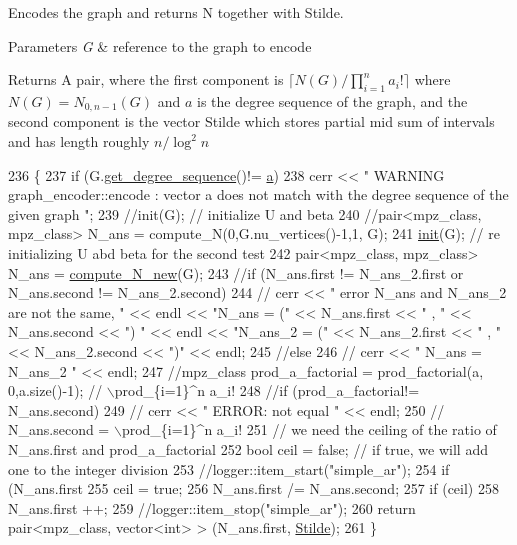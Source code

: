 Encodes the graph and returns N together with Stilde. 


\begin{DoxyParams}{Parameters}
{\em G} & reference to the graph to encode \\
\hline
\end{DoxyParams}
\begin{DoxyReturn}{Returns}
A pair, where the first component is $\lceil N(G) / \prod_{i=1}^n a_i! \rceil$ where $N(G) = N_{0,n-1}(G)$ and $a$ is the degree sequence of the graph, and the second component is the vector Stilde which stores partial mid sum of intervals and has length roughly $n / \log^2 n$ 
\end{DoxyReturn}

\begin{DoxyCode}
236                                                                  \{
237   \textcolor{keywordflow}{if} (G.\hyperlink{classgraph_afdca627df7fb93a7d1d8a547f616e948}{get\_degree\_sequence}()!= \hyperlink{classgraph__encoder_a56eb5cf480ae5c2fca9f3a45f2ffd4f1}{a})
238     cerr << \textcolor{stringliteral}{" WARNING graph\_encoder::encode : vector a does not match with the degree sequence of the given
       graph "};
239   \textcolor{comment}{//init(G); // initialize U and beta }
240   \textcolor{comment}{//pair<mpz\_class, mpz\_class> N\_ans  = compute\_N(0,G.nu\_vertices()-1,1, G);}
241   \hyperlink{classgraph__encoder_a6cfb6fca4bc50d4e5d267060a91f43c3}{init}(G); \textcolor{comment}{// re initializing U abd beta for the second test}
242   pair<mpz\_class, mpz\_class> N\_ans = \hyperlink{classgraph__encoder_aeab221523400ec73da6146fdbbd11274}{compute\_N\_new}(G);
243   \textcolor{comment}{//if (N\_ans.first != N\_ans\_2.first or N\_ans.second != N\_ans\_2.second)}
244   \textcolor{comment}{//  cerr << " error N\_ans and N\_ans\_2 are not the same, "  << endl << "N\_ans = (" << N\_ans.first << " , "
       << N\_ans.second << ") " << endl << "N\_ans\_2 = (" << N\_ans\_2.first << " , " << N\_ans\_2.second << ")" <<
       endl;}
245   \textcolor{comment}{//else}
246   \textcolor{comment}{//  cerr << " N\_ans = N\_ans\_2 " << endl;}
247   \textcolor{comment}{//mpz\_class prod\_a\_factorial = prod\_factorial(a, 0,a.size()-1); // \(\backslash\)prod\_\{i=1\}^n a\_i!}
248   \textcolor{comment}{//if (prod\_a\_factorial!= N\_ans.second)}
249   \textcolor{comment}{//  cerr << " ERROR: not equal " << endl;}
250   \textcolor{comment}{// N\_ans.second = \(\backslash\)prod\_\{i=1\}^n a\_i!}
251   \textcolor{comment}{// we need the ceiling of the ratio of N\_ans.first and prod\_a\_factorial}
252   \textcolor{keywordtype}{bool} ceil = \textcolor{keyword}{false}; \textcolor{comment}{// if true, we will add one to the integer division}
253   \textcolor{comment}{//logger::item\_start("simple\_ar");}
254   \textcolor{keywordflow}{if} (N\_ans.first %
255     ceil = \textcolor{keyword}{true};
256   N\_ans.first /= N\_ans.second;
257   \textcolor{keywordflow}{if} (ceil)
258     N\_ans.first ++;
259   \textcolor{comment}{//logger::item\_stop("simple\_ar");}
260   \textcolor{keywordflow}{return} pair<mpz\_class, vector<int> > (N\_ans.first, \hyperlink{classgraph__encoder_a342688a3fdee511b7fae3f155cfb10cf}{Stilde});
261 \}
\end{DoxyCode}
